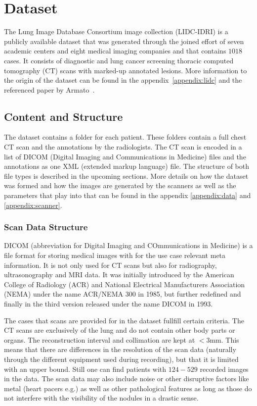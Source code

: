\documentclass[../Thesis.tex]{subfiles}
\begin{document}
\chapter{Dataset}\label{chap:data}
The Lung Image Database Consortium image collection (LIDC-IDRI) is a publicly available dataset that was generated through the joined effort of seven academic centers and eight medical imaging companies and that contains $1018$ cases. It consists of diagnostic and lung cancer screening thoracic computed tomography (CT) scans with marked-up annotated lesions. More information to the origin of the dataset can be found in the appendix~\ref{appendix:lidc} and the referenced paper by Armato~\cite{armato2011lung}.

\section{Content and Structure}
The dataset contains a folder for each patient. These folders contain a full chest CT scan and the annotations by the radiologists. The CT scan is encoded in a list of DICOM (Digital Imaging and Communications in Medicine) files and the annotations as one XML (extended markup language) file. The structure of both file types is described in the upcoming sections. More details on how the dataset was formed and how the images are generated by the scanners as well as the parameters that play into that can be found in the appendix \ref{appendix:data} and \ref{appendix:scanner}.

\subsection{Scan Data Structure}
DICOM (abbreviation for Digital Imaging and COmmunications in Medicine) is a file format for storing medical images with for the use case relevant meta information. It is not only used for CT scans but also for radiography, ultrasonography and MRI data. It was initially introduced by the American College of Radiology (ACR) and National Electrical Manufacturers Association (NEMA) under the name ACR/NEMA 300 in 1985, but further redefined and finally in the third version released under the name DICOM in 1993\cite{pianykh2008}.

The cases that scans are provided for in the dataset fullfill certain criteria. The CT scans are exclusively of the lung and do not contain other body parts or organs. The reconstruction interval and collimation are kept at $<3$mm. This means that there are differences in the resolution of the scan data (naturally through the different equipment used during recording), but that it is limited with an upper bound. Still one can find patients with $124-529$ recorded images in the data. The scan data may also include noise or other disruptive factors like metal (heart pacers e.g.) as well as other pathological features as long as those do not interfere with the visibility of the nodules in a drastic sense.
\end{document}
